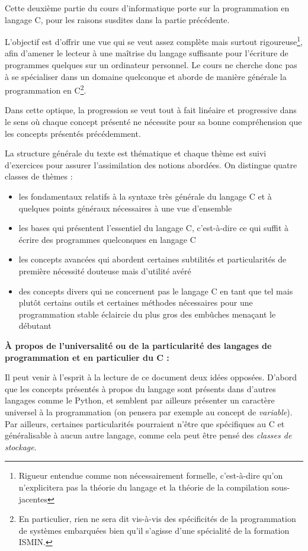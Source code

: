 \documentclass[../../main.tex]{subfiles}
\begin{document}
Cette deuxième partie du cours d'informatique porte sur la programmation en langage C, pour les raisons susdites dans la partie précédente.
 
L'objectif est d'offrir une vue qui se veut assez complète mais surtout rigoureuse\footnote{Rigueur entendue comme non nécessairement formelle, c'est-à-dire qu'on n'explicitera pas la théorie du langage et la théorie de la compilation sous-jacentes}, afin d'amener le lecteur à une maîtrise du langage suffisante pour l'écriture de programmes quelques sur un ordinateur personnel. Le cours ne cherche donc pas à se spécialiser dans un domaine quelconque et aborde de manière générale la programmation en C\footnote{En particulier, rien ne sera dit vis-à-vis des spécificités de la programmation de systèmes embarquées bien qu'il s'agisse d'une spécialité de la formation ISMIN.}.
 
Dans cette optique, la progression se veut tout à fait linéaire et progressive dans le sens où chaque concept présenté ne nécessite pour sa bonne compréhension que les concepts présentés précédemment.
 
La structure générale du texte est thématique et chaque thème est suivi d'exercices pour assurer l'assimilation des notions abordées. On distingue quatre classes de thèmes :
\begin{itemize}
	\item les fondamentaux relatifs à la syntaxe très générale du langage C et à quelques points généraux nécessaires à une vue d'ensemble
	\item les bases qui présentent l'essentiel du langage C, c'est-à-dire ce qui suffit à écrire des programmes quelconques en langage C
	\item les concepts avancées qui abordent certaines subtilités et particularités de première nécessité douteuse mais d'utilité avéré
	\item des concepts divers qui ne concernent pas le langage C en tant que tel mais plutôt certains outils et certaines méthodes nécessaires pour une programmation stable éclaircie du plus gros des embûches menaçant le débutant 
\end{itemize}
\textbf{À propos de l'universalité ou de la particularité des langages de programmation et en particulier du C :}
 
Il peut venir à l'esprit à la lecture de ce document deux idées opposées. D'abord que les concepts présentés à propos du langage sont présents dans d'autres langages comme le Python, et semblent par ailleurs présenter un caractère universel à la programmation (on pensera par exemple au concept de \textit{variable}). Par ailleurs, certaines particularités pourraient n'être que spécifiques au C et généralisable à aucun autre langage, comme cela peut être pensé des \textit{classes de stockage}.
 
\end{document}
